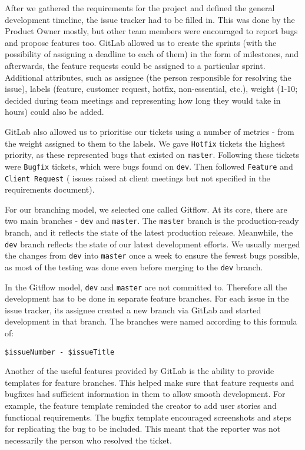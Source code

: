 \documentclass{l3proj}
\begin{document}
After we gathered the requirements for the project and defined the general
 development timeline, the issue tracker had to be filled in. This was done by 
 the Product Owner mostly, but other team members were encouraged to report bugs and
 propose features too. GitLab allowed
 us to create the sprints (with the possibility of assigning a deadline
 to each of them) in the form of milestones, and afterwards, the feature 
 requests could be assigned to a
 particular sprint. Additional attributes, such as assignee (the person
 responsible for resolving the issue), labels (feature, customer request,
 hotfix, non-essential, etc.), weight (1-10; decided during team meetings
 and representing how long they would take in hours) could also be added.
 
GitLab also allowed us to prioritise our tickets using a number of metrics - 
 from the weight assigned to them to the labels. We gave \texttt{Hotfix} tickets
 the highest priority, as these represented bugs that existed on \texttt{master}. 
 Following these tickets were \texttt{Bugfix} tickets, which were bugs found on 
 \texttt{dev}. Then followed \texttt{Feature} and \texttt{Client Request} (
 issues raised at client meetings but not specified in the requirements document). 

For our branching model, we selected one called Gitflow\cite{gitflow}. At
 its core, there are two main branches - \texttt{dev} and \texttt{master}. The \texttt{master} branch
 is the production-ready branch, and it reflects the state of the latest
 production release. Meanwhile, the \texttt{dev} branch reflects the state of our
 latest development efforts. We usually merged the changes from \texttt{dev} into
 \texttt{master} once a week to ensure the fewest bugs possible, as most
 of the testing was done even before merging to the \texttt{dev} branch.



In the Gitflow model, \texttt{dev} and \texttt{master} are not committed to. Therefore
 all the development has to be done in separate feature branches. 
 For each issue in the issue tracker, its assignee created a
 new branch via GitLab and started development in that branch. The 
 branches were named according to this formula of:
 
 \texttt{\$issueNumber - \$issueTitle}

Another of the useful features provided by GitLab is the ability to 
 provide templates for feature branches. This helped make sure that 
 feature requests and bugfixes had sufficient information in them to
 allow smooth development. For example, the feature template reminded
 the creator to add user stories and functional requirements. The bugfix
 template encouraged screenshots and steps for replicating the bug to be
 included. This meant that the reporter was not necessarily the person who
 resolved the ticket.
 
\end{document}
